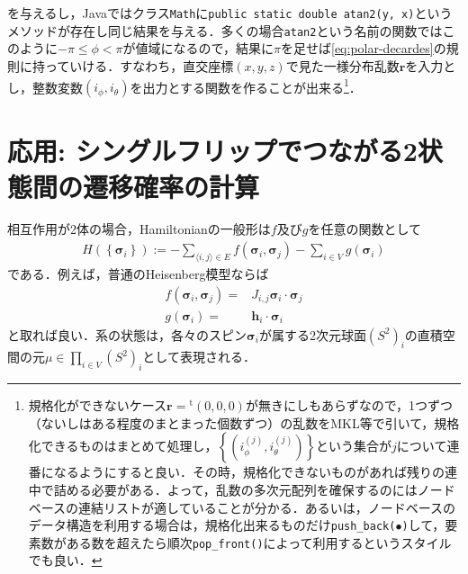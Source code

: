\documentclass[a4,10pt, platex, dvipdfmx]{jsarticle}
\newcommand{\pair}[2]{\langle #1, #2 \rangle}
\newcommand{\dotprod}[2]{#1 \cdot #2}
\newcommand{\spin}{\bm{\sigma}}
\begin{document}
    を与えるし，Javaではクラス\texttt{Math}に\texttt{public static double atan2(y, x)}というメソッドが存在し同じ結果を与える．多くの場合\texttt{atan2}という名前の関数ではこのように$-\pi \leq \phi < \pi$が値域になるので，結果に$\pi$を足せば\eqref{eq:polar-decardes}の規則に持っていける．すなわち，直交座標$(x, y, z)$で見た一様分布乱数$\bm{r}$を入力とし，整数変数$\left(i_{\phi}, i_{\theta}\right)$を出力とする関数を作ることが出来る\footnote{規格化ができないケース$ \bm{r} = {}^{\mathrm{t}} (0, 0, 0) $が無きにしもあらずなので，1つずつ（ないしはある程度のまとまった個数ずつ）の乱数をMKL等で引いて，規格化できるものはまとめて処理し，$\left\{\left(i^{(j)}_{\phi}, i^{(j)}_{\theta}\right)\right\}$という集合が$j$について連番になるようにすると良い．その時，規格化できないものがあれば残りの連中で詰める必要がある．よって，乱数の多次元配列を確保するのにはノードベースの連結リストが適していることが分かる．あるいは，ノードベースのデータ構造を利用する場合は，規格化出来るものだけ\texttt{push\_back($\bullet$)}して，要素数がある数を超えたら順次\texttt{pop\_front()}によって利用するというスタイルでも良い．}．

    \section{応用: シングルフリップでつながる2状態間の遷移確率の計算}
    相互作用が2体の場合，Hamiltonianの一般形は$f$及び$g$を任意の関数として
    \begin{align}
        H\left( \left\{\spin_{i}\right\} \right) := - \sum_{\pair{i}{j} \in E} f\left(\spin_{i}, \spin_{j}\right) - \sum_{i \in V}g\left(\spin_{i}\right)
    \end{align}
    である．例えば，普通のHeisenberg模型ならば
    \begin{align}
        f\left(\spin_{i}, \spin_{j}\right) = & J_{i, j} \dotprod{\spin_{i}}{\spin_{j}} \\
        g\left(\spin_{i}\right) = & \dotprod{\bm{h}_{i}}{\spin_{i}}
    \end{align}
    と取れば良い．系の状態は，各々のスピン$\spin_{i}$が属する2次元球面$\left(S^{2}\right)_{i}$の直積空間の元$\mu \in \prod_{i \in V}\left(S^{2}\right)_{i}$として表現される．
    
\end{document}
